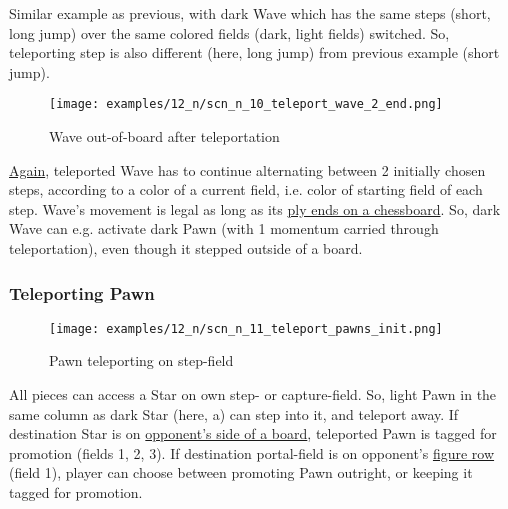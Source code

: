 Similar example as previous, with dark Wave which has the same steps (short,
long jump) over the same colored fields (dark, light fields) switched. So,
teleporting step is also different (here, long jump) from previous example
(short jump).

\clearpage %

\vspace*{-2.0\baselineskip}
\noindent
\begin{figure}[!h]
\texttt{[image: examples/12\_n/scn\_n\_10\_teleport\_wave\_2\_end.png]}
\caption{Wave out-of-board after teleportation}
\label{fig:scn_n_10_teleport_wave_2_end}
\end{figure}

\hyperref[fig:scn_n_08_teleport_wave_end]{Again},
teleported Wave has to continue alternating between 2 initially chosen steps,
according to a color of a current field, i.e. color of starting field of each
step. Wave's movement is legal as long as its
\hyperref[fig:scn_mv_034_wave_off_board]{ply ends on a chessboard}. So, dark
Wave can e.g. activate dark Pawn (with 1 momentum carried through teleportation),
even though it stepped outside of a board.

\clearpage %

\subsubsection*{Teleporting Pawn}
\label{sec:Nineteen/Star/Teleporting pieces/Teleporting Pawn}

\vspace*{-1.4\baselineskip}
\noindent
\begin{figure}[!h]
\texttt{[image: examples/12\_n/scn\_n\_11\_teleport\_pawns\_init.png]}
\caption{Pawn teleporting on step-field}
\label{fig:scn_n_11_teleport_pawns_init}
\end{figure}

All pieces can access a Star on own step- or capture-field. So, light Pawn in
the same column as dark Star (here, a) can step into it, and teleport away. If
destination Star is on
\hyperref[sec:Definitions/Chessboard sides, navigation]{opponent's side of a board},
teleported Pawn is tagged for
promotion (fields 1, 2, 3). If destination portal-field is on opponent's
\hyperref[sec:Terms/Figure row]{figure row} (field 1), player can choose between
promoting Pawn outright, or keeping it tagged for promotion.

